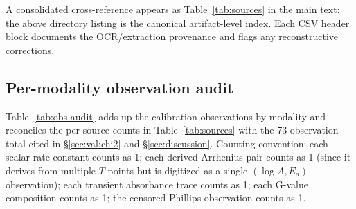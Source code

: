 \documentclass[11pt]{article}
\theoremstyle{plain}
\theoremstyle{definition}
\theoremstyle{remark}
\newcommand{\Ea}{E_a}
\begin{document}
A consolidated cross-reference appears as Table~\ref{tab:sources} in the
main text; the above directory listing is the canonical artifact-level
index.  Each CSV header block documents the OCR/extraction provenance and
flags any reconstructive corrections.

\subsection{Per-modality observation audit}\label{app:obs-audit}

Table~\ref{tab:obs-audit} adds up the calibration observations by
modality and reconciles the per-source counts in Table~\ref{tab:sources}
with the 73-observation total cited in §\ref{sec:val:chi2} and
§\ref{sec:discussion}.  Counting convention: each scalar rate constant
counts as 1; each derived Arrhenius pair counts as 1 (since it derives
from multiple $T$-points but is digitized as a single $(\log A, \Ea)$
observation); each transient absorbance trace counts as 1; each
G-value composition counts as 1; the censored Phillips observation
counts as 1.
\end{document}
